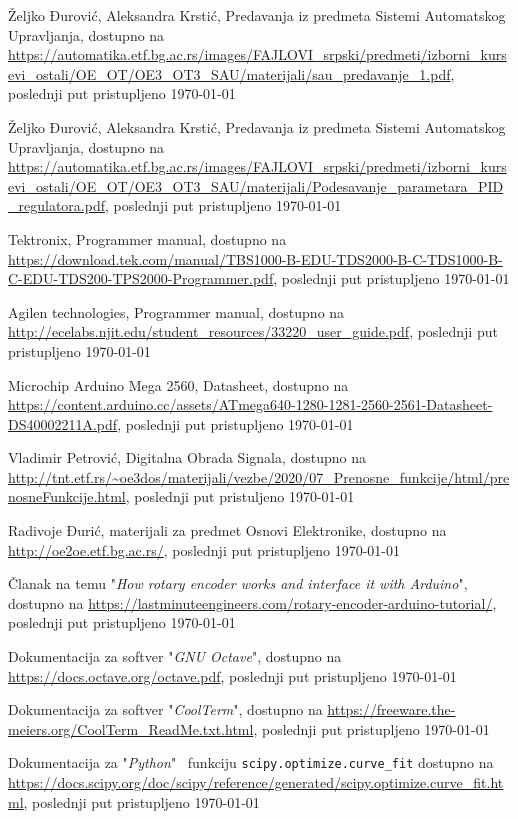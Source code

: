 
\begin{thebibliography}{9}

Željko Đurović, Aleksandra Krstić, Predavanja iz predmeta Sistemi Automatskog Upravljanja,
dostupno na \url{https://automatika.etf.bg.ac.rs/images/FAJLOVI_srpski/predmeti/izborni_kursevi_ostali/OE_OT/OE3_OT3_SAU/materijali/sau_predavanje_1.pdf}, 
poslednji put pristupljeno \today

Željko Đurović, Aleksandra Krstić, Predavanja iz predmeta Sistemi Automatskog Upravljanja,
dostupno na \url{https://automatika.etf.bg.ac.rs/images/FAJLOVI_srpski/predmeti/izborni_kursevi_ostali/OE_OT/OE3_OT3_SAU/materijali/Podesavanje_parametara_PID_regulatora.pdf}, 
poslednji put pristupljeno \today

Tektronix, Programmer manual,
dostupno na \url{https://download.tek.com/manual/TBS1000-B-EDU-TDS2000-B-C-TDS1000-B-C-EDU-TDS200-TPS2000-Programmer.pdf}, 
poslednji put pristupljeno \today

Agilen technologies, Programmer manual,
dostupno na \url{http://ecelabs.njit.edu/student_resources/33220_user_guide.pdf}, 
poslednji put pristupljeno \today

Microchip Arduino Mega 2560, Datasheet,
dostupno na \url{https://content.arduino.cc/assets/ATmega640-1280-1281-2560-2561-Datasheet-DS40002211A.pdf}, 
poslednji put pristupljeno \today

Vladimir Petrović, Digitalna Obrada Signala,
dostupno na \url{http://tnt.etf.rs/~oe3dos/materijali/vezbe/2020/07_Prenosne_funkcije/html/prenosneFunkcije.html},
poslednji put pristuljeno \today

Radivoje Đurić, materijali za predmet Osnovi Elektronike,
dostupno na \url{http://oe2oe.etf.bg.ac.rs/},
poslednji put pristupljeno \today

Članak na temu "\textit{How rotary encoder works and interface it with Arduino}",
dostupno na \url{https://lastminuteengineers.com/rotary-encoder-arduino-tutorial/},
poslednji put pristupljeno \today

Dokumentacija za softver "\textit{GNU Octave}",
dostupno na \url{https://docs.octave.org/octave.pdf},
poslednji put pristupljeno \today

Dokumentacija za softver "\textit{CoolTerm}",
dostupno na \url{https://freeware.the-meiers.org/CoolTerm_ReadMe.txt.html},
poslednji put pristupljeno \today

Dokumentacija za "\textit{Python}" \, funkciju \verb|scipy.optimize.curve_fit|
dostupno na \url{https://docs.scipy.org/doc/scipy/reference/generated/scipy.optimize.curve_fit.html},
poslednji put pristupljeno \today


\end{thebibliography}

